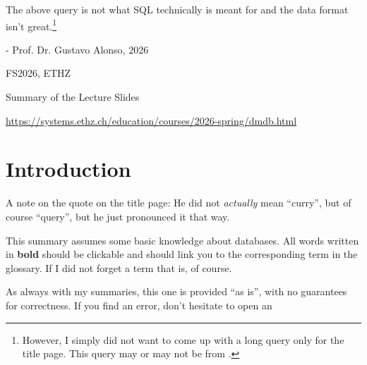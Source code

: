 \documentclass{article}
\begin{document}
\startDocument

\mediumverticalspacing

\vspace{2cm}
{\scriptsize
    The above query is not what SQL technically is meant for and the data format isn't great.\footnote{
        However, I simply did not want to come up with a long query only for the title page. This query may or may not be from
        .}
}


\vspace{3cm}
\begin{center}
    \begin{Large}
    \end{Large}

    \hspace{3cm} - Prof. Dr. Gustavo Alonso, 2026
\end{center}

\vspace{1.5cm}
\begin{center}
    FS2026, ETHZ

    \begin{Large}
        Summary of the Lecture Slides
    \end{Large}

    \url{https://systems.ethz.ch/education/courses/2026-spring/dmdb.html}
\end{center}

\newpage


\newpage

\section{Introduction}
A note on the quote on the title page: He did not \textit{actually} mean ``curry'', but of course ``query'', but he just pronounced it that way.

This summary assumes some basic knowledge about databases.
All words written in \textbf{bold} should be clickable and should link you to the corresponding term in the glossary.
If I did not forget a term that is, of course.

As always with my summaries, this one is provided ``as is'', with no guarantees for correctness.
If you find an error, don't hesitate to open an 
\end{document}
